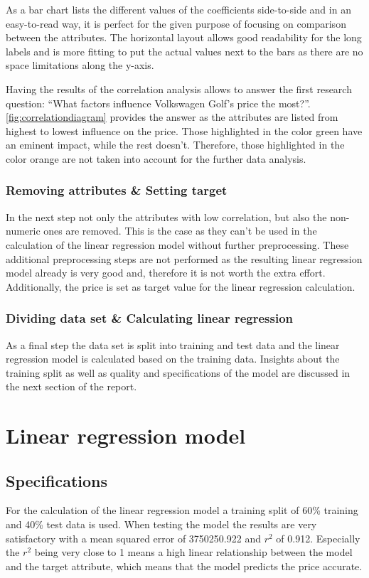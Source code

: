 As a bar chart lists the different values of the coefficients side-to-side and in an easy-to-read way, it is perfect for the 
given purpose of focusing on comparison between the attributes. 
The horizontal layout allows good readability for the long labels and is more fitting to put the actual values next to the
bars as there are no space limitations along the y-axis. 
\par
Having the results of the correlation analysis allows to answer the first research question: \enquote{What factors influence Volkswagen Golf's price the most?}.
\autoref{fig:correlationdiagram} provides the answer as the attributes are listed from highest to lowest influence on the price. Those highlighted in the color green
have an eminent impact, while the rest doesn't. Therefore, those highlighted in the color orange are not taken into account for the further data analysis.

\subsubsection{Removing attributes \& Setting target}
In the next step not only the attributes with low correlation, but also the non-numeric ones are removed. This is the case as they can't be used in the calculation
of the linear regression model without further preprocessing. These additional preprocessing steps are not performed as the resulting linear regression
model already is very good and, therefore it is not worth the extra effort. 
Additionally, the price is set as target value for the linear regression calculation.

\subsubsection{Dividing data set \& Calculating linear regression}
As a final step the data set is split into training and test data and the linear regression model is calculated based on the
training data. Insights about the training split as well as quality and specifications of the model are discussed in the next section of the report. 

\section{Linear regression model}
\subsection{Specifications}
For the calculation of the linear regression model a training split of 60\% training and 40\% test data is used.
When testing the model the results are very satisfactory with a mean squared error of 3750250.922 and ${r}^2$ of 0.912.
Especially the ${r}^2$ being very close to 1 means a high linear relationship between the model and the target attribute,
which means that the model predicts the price accurate.

